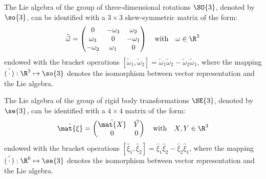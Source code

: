 \begin{definition}
The Lie algebra of the group of three-dimensional rotations $\SO{3}$, denoted by $\so{3}$, can be identified with a $3 \times 3$ skew-symmetric matrix of the form:
\begin{equation}
\tilde{\vec{\omega}} = 
\begin{pmatrix} 0 & -\omega_3 & \omega_2 \\ \omega_3 & 0 & -\omega_1 \\ -\omega_2 & \omega_1 & 0 \end{pmatrix} \quad \text{with} \quad \omega \in \R^3
\end{equation}
endowed with the bracket operations $[\tilde{\omega}_1,\tilde{\omega}_2] = \tilde{\omega}_1\tilde{\omega}_2 - \tilde{\omega}_2 \tilde{\omega}_1$, where the mapping $\tilde{(\,\cdot\,)}: \R^3 \mapsto \so{3}$ denotes the isomorphism between vector representation and the Lie algebra.
\end{definition}

\begin{definition}
The Lie algebra of the group of rigid body transformations $\SE{3}$, denoted by $\se{3}$, can be identified with a $4 \times 4$ matrix of the form:
\begin{equation}
\hat{\mat{\xi}} = 
\begin{pmatrix} \tilde{\mat{X}} & \vec{Y} \\ 0 & 0 \end{pmatrix} \quad \text{with} \quad X,Y \in \R^3
\end{equation}
endowed with the bracket operations $[\hat{\xi}_1,\hat{\xi}_2] = \hat{\xi}_1\hat{\xi}_2 - \hat{\xi}_2 \hat{\xi}_1$, where the mapping $\hat{(\,\cdot\,)}: \R^6 \mapsto \se{3}$ denotes the isomorphism between vector representation and the Lie algebra.

\end{definition}


